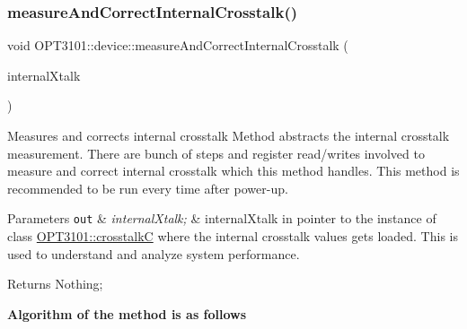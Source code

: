 \subsubsection{\texorpdfstring{measure\+And\+Correct\+Internal\+Crosstalk()}{measureAndCorrectInternalCrosstalk()}}
{\footnotesize\ttfamily void O\+P\+T3101\+::device\+::measure\+And\+Correct\+Internal\+Crosstalk (\begin{DoxyParamCaption}\item[{\mbox{\hyperlink{class_o_p_t3101_1_1crosstalk_c}{O\+P\+T3101\+::crosstalkC}} $\ast$}]{internal\+Xtalk }\end{DoxyParamCaption})}



Measures and corrects internal crosstalk Method abstracts the internal crosstalk measurement. There are bunch of steps and register read/writes involved to measure and correct internal crosstalk which this method handles. This method is recommended to be run every time after power-\/up. 


\begin{DoxyParams}[1]{Parameters}
\mbox{\tt out}  & {\em internal\+Xtalk;} & internal\+Xtalk in pointer to the instance of class \mbox{\hyperlink{class_o_p_t3101_1_1crosstalk_c}{O\+P\+T3101\+::crosstalkC}} where the internal crosstalk values gets loaded. This is used to understand and analyze system performance. \\
\hline
\end{DoxyParams}
\begin{DoxyReturn}{Returns}
Nothing; 
\end{DoxyReturn}
{\bfseries Algorithm of the method is as follows}


